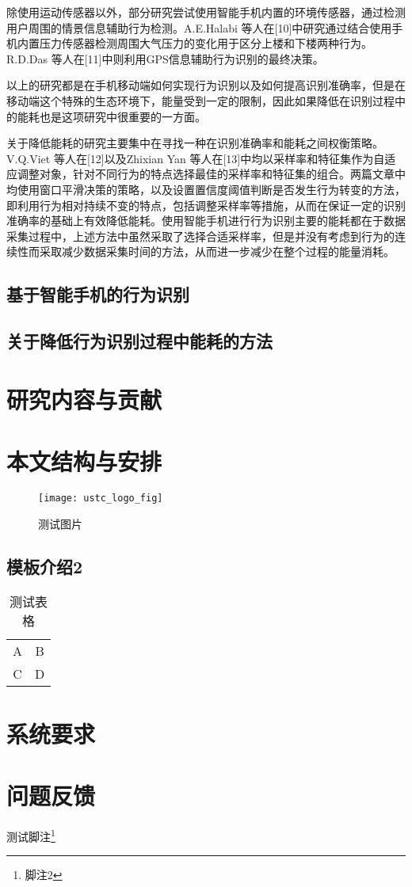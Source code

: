 \par 除使用运动传感器以外，部分研究尝试使用智能手机内置的环境传感器，通过检测用户周围的情景信息辅助行为检测。A.E.Halabi 等人在[10]中研究通过结合使用手机内置压力传感器检测周围大气压力的变化用于区分上楼和下楼两种行为。R.D.Das 等人在[11]中则利用GPS信息辅助行为识别的最终决策。
\par 以上的研究都是在手机移动端如何实现行为识别以及如何提高识别准确率，但是在移动端这个特殊的生态环境下，能量受到一定的限制，因此如果降低在识别过程中的能耗也是这项研究中很重要的一方面。
\par 关于降低能耗的研究主要集中在寻找一种在识别准确率和能耗之间权衡策略。V.Q.Viet 等人在[12]以及Zhixian Yan 等人在[13]中均以采样率和特征集作为自适应调整对象，针对不同行为的特点选择最佳的采样率和特征集的组合。两篇文章中均使用窗口平滑决策的策略，以及设置置信度阈值判断是否发生行为转变的方法，即利用行为相对持续不变的特点，包括调整采样率等措施，从而在保证一定的识别准确率的基础上有效降低能耗。使用智能手机进行行为识别主要的能耗都在于数据采集过程中，上述方法中虽然采取了选择合适采样率，但是并没有考虑到行为的连续性而采取减少数据采集时间的方法，从而进一步减少在整个过程的能量消耗。
\subsection{基于智能手机的行为识别}
\subsection{关于降低行为识别过程中能耗的方法}
\section{研究内容与贡献}
\section{本文结构与安排}

\begin{figure}[ht]
\centering
\texttt{[image: ustc\_logo\_fig]}
\caption{测试图片}
\end{figure}


\subsection{模板介绍2}

\begin{table}[ht]
\centering
\caption{测试表格}
\begin{tabular}{cc}
A   &   B   \\
C   &   D   \\
\end{tabular}
\end{table}



\section{系统要求}



\section{问题反馈}
测试脚注\footnote{脚注2}
